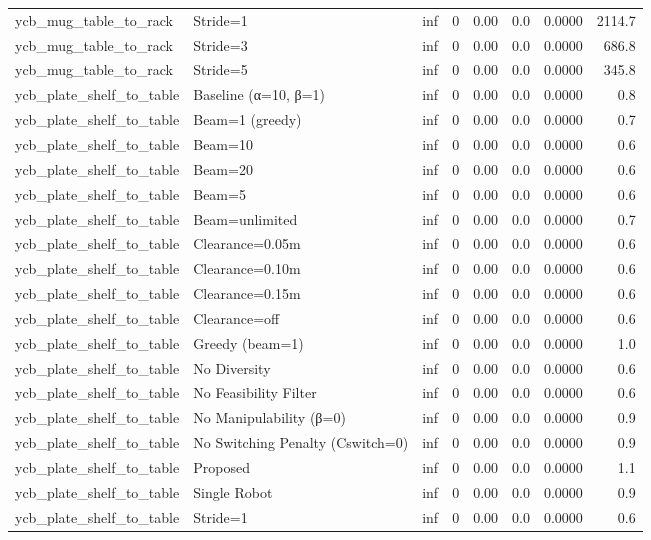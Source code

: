 \begin{table}[ht]
{\begin{tabular}{l l r r r r r r}
  ycb\_mug\_table\_to\_rack & Stride=1 & inf & 0 & 0.00 & 0.0 & 0.0000 & 2114.7 \\
  ycb\_mug\_table\_to\_rack & Stride=3 & inf & 0 & 0.00 & 0.0 & 0.0000 & 686.8 \\
  ycb\_mug\_table\_to\_rack & Stride=5 & inf & 0 & 0.00 & 0.0 & 0.0000 & 345.8 \\
  ycb\_plate\_shelf\_to\_table & Baseline (α=10, β=1) & inf & 0 & 0.00 & 0.0 & 0.0000 & 0.8 \\
  ycb\_plate\_shelf\_to\_table & Beam=1 (greedy) & inf & 0 & 0.00 & 0.0 & 0.0000 & 0.7 \\
  ycb\_plate\_shelf\_to\_table & Beam=10 & inf & 0 & 0.00 & 0.0 & 0.0000 & 0.6 \\
  ycb\_plate\_shelf\_to\_table & Beam=20 & inf & 0 & 0.00 & 0.0 & 0.0000 & 0.6 \\
  ycb\_plate\_shelf\_to\_table & Beam=5 & inf & 0 & 0.00 & 0.0 & 0.0000 & 0.6 \\
  ycb\_plate\_shelf\_to\_table & Beam=unlimited & inf & 0 & 0.00 & 0.0 & 0.0000 & 0.7 \\
  ycb\_plate\_shelf\_to\_table & Clearance=0.05m & inf & 0 & 0.00 & 0.0 & 0.0000 & 0.6 \\
  ycb\_plate\_shelf\_to\_table & Clearance=0.10m & inf & 0 & 0.00 & 0.0 & 0.0000 & 0.6 \\
  ycb\_plate\_shelf\_to\_table & Clearance=0.15m & inf & 0 & 0.00 & 0.0 & 0.0000 & 0.6 \\
  ycb\_plate\_shelf\_to\_table & Clearance=off & inf & 0 & 0.00 & 0.0 & 0.0000 & 0.6 \\
  ycb\_plate\_shelf\_to\_table & Greedy (beam=1) & inf & 0 & 0.00 & 0.0 & 0.0000 & 1.0 \\
  ycb\_plate\_shelf\_to\_table & No Diversity & inf & 0 & 0.00 & 0.0 & 0.0000 & 0.6 \\
  ycb\_plate\_shelf\_to\_table & No Feasibility Filter & inf & 0 & 0.00 & 0.0 & 0.0000 & 0.6 \\
  ycb\_plate\_shelf\_to\_table & No Manipulability (β=0) & inf & 0 & 0.00 & 0.0 & 0.0000 & 0.9 \\
  ycb\_plate\_shelf\_to\_table & No Switching Penalty (Cswitch=0) & inf & 0 & 0.00 & 0.0 & 0.0000 & 0.9 \\
  ycb\_plate\_shelf\_to\_table & Proposed & inf & 0 & 0.00 & 0.0 & 0.0000 & 1.1 \\
  ycb\_plate\_shelf\_to\_table & Single Robot & inf & 0 & 0.00 & 0.0 & 0.0000 & 0.9 \\
  ycb\_plate\_shelf\_to\_table & Stride=1 & inf & 0 & 0.00 & 0.0 & 0.0000 & 0.6 \\

\end{tabular}}
\end{table}
